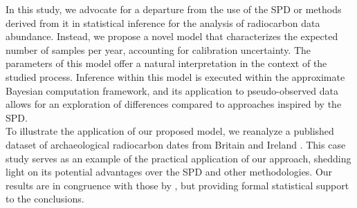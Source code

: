 \documentclass[a4paper]{article}
\begin{document}
In this study, we advocate for a departure from the use of the SPD or methods derived from it in statistical inference for the analysis of radiocarbon data abundance. Instead, we propose a novel model that characterizes the expected number of samples per year, accounting for calibration uncertainty. The parameters of this model offer a natural interpretation in the context of the studied process. Inference within this model is executed within the approximate Bayesian computation framework, and its application to pseudo-observed data allows for an exploration of differences compared to approaches inspired by the SPD.
\\

To illustrate the application of our proposed model, we reanalyze a published dataset of archaeological radiocarbon dates from Britain and Ireland \parencite{Bevan2017a}. This case study serves as an example of the practical application of our approach, shedding light on its potential advantages over the SPD and other methodologies. Our results are in congruence with those by \textcite{Bevan2017a}, but providing formal statistical support to the conclusions. 
\\





\end{document}
